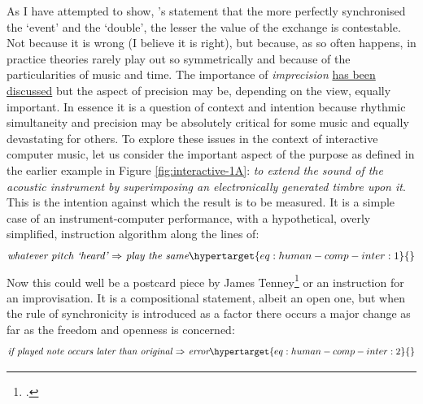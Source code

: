 As I have attempted to show, \citeauthor{baudrillard02}'s statement that the more perfectly synchronised the `event' and the `double', the lesser the value of the exchange is contestable. Not because it is wrong (I believe it is right), but because, as so often happens, in practice theories rarely play out so symmetrically and because of the particularities of music and time. The importance of \emph{imprecision} \hyperlink{par:human-comp-inter:8-1}{has been discussed} but the aspect of precision may be, depending on the view, equally important. In essence it is a question of context and intention because rhythmic simultaneity and precision may be absolutely critical for some music and equally devastating for others. To explore these issues in the context of interactive computer music, let us consider the important aspect of the purpose as defined in the earlier example in Figure \ref{fig:interactive-1A}: \emph{to extend the sound of the acoustic instrument by superimposing an electronically generated timbre upon it}. This is the intention against which the result is to be measured. It is a simple case of an instrument-computer performance, with a hypothetical, overly simplified, instruction algorithm along the lines of:
%
\begin{equation}\label{eq:1}
  \emph{whatever pitch `heard' $\Rightarrow$ play the same}
\hypertarget{eq:human-comp-inter:1}{}
   \end{equation}
%
Now this could well be a postcard piece by James Tenney\footcites(The  is a series of eleven short and minimally stated compositions, ``scorecards'' printed on postcards, composed by \citeauthor{tenney04} in the early 1970s.)(){tenney04}[see~also][]{risset87} or an instruction for an improvisation. It is a compositional statement, albeit an open one, but when the rule of synchronicity is introduced as a factor there occurs a major change as far as the freedom and openness is concerned:
%
\begin{equation}\label{eq:2}
\emph{if played note occurs later than original $\Rightarrow$ error}
\hypertarget{eq:human-comp-inter:2}{}
\end{equation}
%
